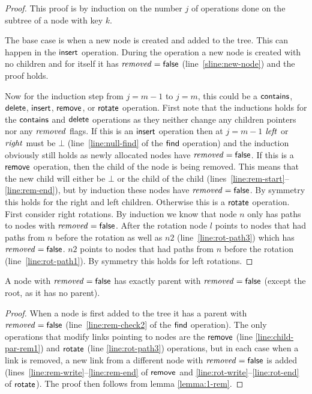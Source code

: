 \begin{proof}
This proof is by induction on the number $j$ of operations done on the subtree of a node with key $k$.

The base case is when a new node is created and added to the tree.
This can happen in the $\act{insert}$ operation.
During the operation a new node is created with no children and for itself it has $\ms{removed}=\lit{false}$ (line~\ref{sline:new-node}) and the proof holds.

Now for the induction step from $j=m-1$ to $j=m$, this could be a $\act{contains}$, $\act{delete}$, $\act{insert}$, $\act{remove}$, or $\act{rotate}$ operation.
First note that the inductions holds for the $\act{contains}$ and $\act{delete}$ operations as they neither change any children pointers nor any $\ms{removed}$ flags.
If this is an $\act{insert}$ operation then at $j=m-1$ $\ms{left}$ or $\ms{right}$ must be $\bot$ (line~\ref{line:null-find} of the $\act{find}$ operation) and the induction obviously still holds
as newly allocated nodes have $\ms{removed}=\lit{false}$.
If this is a $\act{remove}$ operation, then the child of the node is being removed.
This means that the new child will either be $\bot$ or the child of the child (lines~\ref{line:rem-start}--\ref{line:rem-end}), 
but by induction these nodes have $\ms{removed}=\lit{false}$.
By symmetry this holds for the right and left children.
Otherwise this is a $\act{rotate}$ operation.
First consider right rotations.
By induction we know that node $n$ only has paths to nodes with $\ms{removed}=\lit{false}$.
After the rotation node $l$ points to nodes that had paths from $n$ before the rotation as well as $n2$ (line~\ref{line:rot-path3}) which has $\ms{removed}=\lit{false}$.
$n2$ points to nodes that had paths from $n$ before the rotation (line~\ref{line:rot-path1}).%
By symmetry this holds for left rotations.
\end{proof}


\begin{lemma}
\label{lemma:false-rem-par}
A node with $\ms{removed}=\lit{false}$ has exactly parent with $\ms{removed}=\lit{false}$ (except the root, as it has no parent).
\end{lemma}
\begin{proof}
When a node is first added to the tree it has a parent with $\ms{removed}=\lit{false}$ (line~\ref{line:rem-check2} of the $\act{find}$ operation).
The only operations that modify links pointing to nodes are the $\act{remove}$ (line \ref{line:child-par-rem1}) and $\act{rotate}$ (line \ref{line:rot-path3}) operations,
but in each case when a link is removed, a new link from a different node with $\ms{removed}=\lit{false}$ is added
(lines~\ref{line:rem-write}--\ref{line:rem-end} of $\act{remove}$ and \ref{line:rot-write}--\ref{line:rot-end} of $\act{rotate}$).
The proof then follows from lemma \ref{lemma:1-rem}.
\end{proof}




